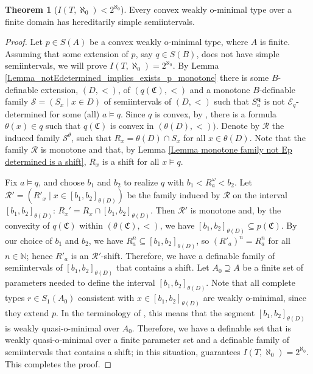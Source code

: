 \documentclass{amsart}
\theoremstyle{definition}
\newtheorem{Theorem}{Theorem}[section]
\theoremstyle{definition}
\newcommand{\Mon}{\mathfrak C}
\begin{document}
\begin{Theorem}[$I(T,\aleph_0)<2^{\aleph_0}$]\label{Theorem convex few ctble has hssi}
Every convex weakly o-minimal type over a finite domain has hereditarily simple semiintervals.
\end{Theorem}
\begin{proof}
Let $p\in S(A)$ be a convex weakly o-minimal type, where $A$ is finite. Assuming that some extension of $p$, say $q\in S(B)$, does not have simple semiintervals, we will prove $I(T,\aleph_0)=2^{\aleph_0}$. By Lemma \ref{Lemma_notEdetermined_implies_exists_p_monotone} there is some $B$-definable extension, $(D,<)$, of $(q(\Mon),<)$ and a monotone $B$-definable family $\mathcal S=(S_x\mid x\in D)$ of semiintervals of $(D,<)$ such that $S^{\mathbf q}_a$ is not $\mathcal E_q$-determined for some (all) $a\models q$. Since $q$ is convex, by \cite[Proposition 3.4]{MTwqom1}, there is a formula $\theta(x)\in q$ such that $q(\Mon)$ is convex in $(\theta(D), <))$. Denote by $\mathcal R$ the induced family $\mathcal S^{\theta}$, such that $R_x=\theta(D)\cap S_x$ for all $x\in\theta(D)$. Note that the family $\mathcal R$ is monotone and that, by Lemma \ref{Lemma monotone family not Ep determined is a shift}, $R_x$ is a shift for all $x\models q$. 

Fix $a\models q$, and choose $b_1$ and $b_2$ to realize $q$ with $b_1<R^\omega_a<b_2$. Let $\mathcal R'=(R'_x\mid x\in [b_1,b_2]_{\theta(D)})$ be the family induced by $\mathcal R$ on the interval $[b_1,b_2]_{\theta(D)}$: $R_x'=R_x\cap [b_1,b_2]_{\theta(D)}$. 
Then $\mathcal R'$ is monotone and, by the convexity of $q(\Mon)$ within $(\theta(\Mon),<)$, we have $[b_1,b_2]_{\theta(D)}\subseteq p(\Mon)$.  By our choice of $b_1$ and $b_2$, we have $R_a^n\subseteq [b_1,b_2]_{\theta(D)}$, so $(R'_a)^n=R_a^n$ for all $n\in \mathbb N$; hence $R'_a$ is an $\mathcal R'$-shift. Therefore, we have a definable family of semiintervals of $[b_1,b_2]_{\theta(D)}$ that contains a shift. Let $A_0\supseteq A$ be a finite set of parameters needed to define the interval $[b_1,b_2]_{\theta(D)}$. Note that all complete types $r\in S_1(A_0)$ consistent with $x\in [b_1,b_2]_{\theta(D)}$ are weakly o-minimal, since  they extend $p$. In the terminology of \cite[Definition 4.8]{MTwom}, this means that the segment $[b_1,b_2]_{\theta(D)}$ is weakly quasi-o-minimal over $A_0$. Therefore, we have a definable set that is weakly quasi-o-minimal over a finite parameter set and a definable family of semiintervals that contains a shift; in this situation, \cite[Theorem 6.17]{MTwqom1} guarantees $I(T,\aleph_0)=2^{\aleph_0}$. This completes the proof.  
\end{proof}
\end{document}
